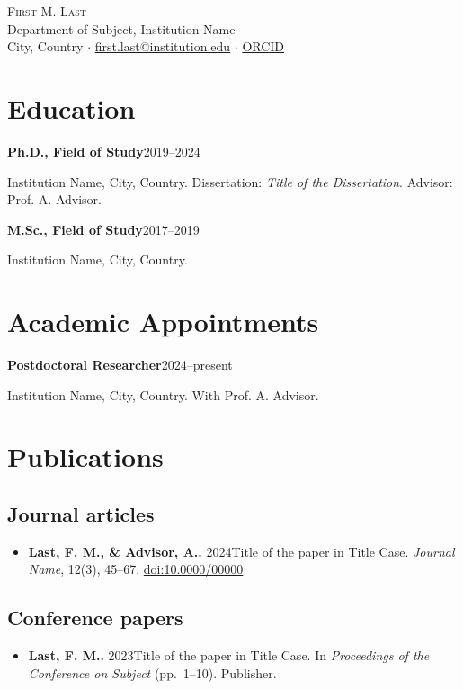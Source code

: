 \documentclass[11pt]{article}
\newcommand{\cventry}[3]{%
  \par\noindent\textbf{#1}\hfill{\small #2}\par
  \noindent #3\par\vspace{4pt}%
}
\newcommand{\cvitem}[2]{\item \textbf{#1.} #2}
\begin{document}
\begin{center}
  {\LARGE\scshape First M. Last}\\[4pt]
  {\small Department of Subject, Institution Name}\\[2pt]
  {\small City, Country \quad$\cdot$\quad
   \href{mailto:first.last@institution.edu}{first.last@institution.edu} \quad$\cdot$\quad
   \href{https://orcid.org/0000-0000-0000-0000}{ORCID}}
\end{center}
\vspace{2pt}

\section{Education}
\cventry{Ph.D., Field of Study}{2019--2024}
        {Institution Name, City, Country. Dissertation: \emph{Title of the
        Dissertation}. Advisor: Prof. A. Advisor.}
\cventry{M.Sc., Field of Study}{2017--2019}
        {Institution Name, City, Country.}

\section{Academic Appointments}
\cventry{Postdoctoral Researcher}{2024--present}
        {Institution Name, City, Country. With Prof. A. Advisor.}

\section{Publications}
\subsection{Journal articles}
\begin{itemize}
  \cvitem{Last, F. M., \& Advisor, A.}{2024}{Title of the paper in Title Case.
        \emph{Journal Name}, 12(3), 45--67.
        \href{https://doi.org/10.0000/00000}{doi:10.0000/00000}}
\end{itemize}
\subsection{Conference papers}
\begin{itemize}
  \cvitem{Last, F. M.}{2023}{Title of the paper in Title Case. In
        \emph{Proceedings of the Conference on Subject} (pp.\ 1--10). Publisher.}
\end{itemize}
\end{document}
